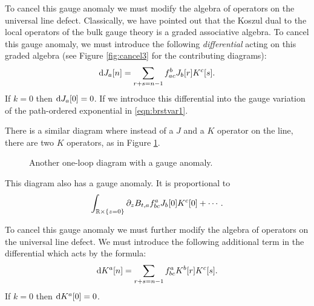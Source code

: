 \documentclass[11pt]{amsart}
\def\brian#1{{\textcolor{blue!65!red}{BRW: {#1}}}}
\begin{document}
To cancel this gauge anomaly we must modify the algebra of operators on the universal line defect.
Classically, we have pointed out that the Koszul dual to the local operators of the bulk gauge theory is a graded associative algebra.
To cancel this gauge anomaly, we must introduce the following {\em differential} acting on this graded algebra (see Figure \ref{fig:cancel3} for the contributing diagrams):
\[
{\rm d} J_a[n] = \sum_{r + s = n-1} f_{ac}^b J_b[r] K^c[s] .
\]
If $k=0$ then ${\rm d} J_a [0] = 0$. 
If we introduce this differential into the gauge variation of the path-ordered exponential in \eqref{eqn:brstvar1}.


There is a similar diagram where instead of a $J$ and a $K$ operator on the line, there are two $K$ operators, as in Figure \ref{fig:oneloop2}. 
\begin{figure}
	\caption{Another one-loop diagram with a gauge anomaly.
	\label{fig:oneloop2}}
\end{figure}
This diagram also has a gauge anomaly.
It is proportional to
\[
\int_{\mathbb R \times \{z=0\}} \partial_z B_{t,a} f_{bc}^a J_{b} [0] K^c [0] + \cdots .
\]

To cancel this gauge anomaly we must further modify the algebra of operators on the universal line defect.
We must introduce the following additional term in the differential which acts by the formula:
\[
{\rm d} K^a[n] = \sum_{r + s = n-1} f_{bc}^a K^b[r] K^c [s] .
\]
If $k=0$ then ${\rm d} K^a [0] = 0$. 

%
%
\end{document}

